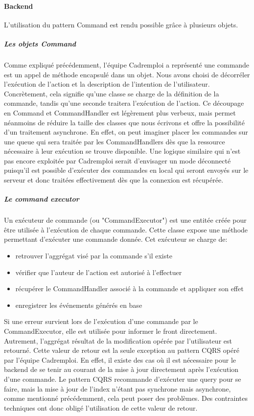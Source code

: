 \paragraph{Backend}
\label{par:Backend}
L'utilisation du pattern Command est rendu possible grâce à plusieurs objets.
\subparagraph{Les objets Command}
\label{subp:Les objets Command}
Comme expliqué précédemment, l'équipe Cadremploi a représenté une commande est un appel de méthode encapsulé dans un objet.
Nous avons choisi de décorréler l'exécution de l'action et la description de l'intention de l'utilisateur.
Concrètement, cela signifie qu'une classe se charge de la définition de la commande, tandis qu'une seconde traitera l'exécution de l'action.
Ce découpage en Command et CommandHandler est légèrement plus verbeux, mais permet néanmoins de réduire la taille des classes que nous écrivons et offre la possibilité d'un traitement asynchrone.
En effet, on peut imaginer placer les commandes sur une queue qui sera traitée par les CommandHandlers dès que la ressource nécessaire à leur exécution se trouve disponible.
Une logique similaire qui n'est pas encore exploitée par Cadremploi serait d'envisager un mode déconnecté puisqu'il est possible d'exécuter des commandes en local qui seront envoyés sur le serveur et donc traitées effectivement dès que la connexion est récupérée.

\subparagraph{Le command executor}
\label{subp:Le command executor}
Un exécuteur de commande (ou "CommandExecutor") est une entitée créée pour être utilisée à l'exécution de chaque commande.
Cette classe expose une méthode permettant d'exécuter une commande donnée.
Cet exécuteur se charge de:
\begin{itemize}
  \item retrouver l'aggrégat visé par la commande s'il existe
  \item vérifier que l'auteur de l'action est autorisé à l'effectuer
  \item récupérer le CommandHandler associé à la commande et appliquer son effet
  \item enregistrer les événements générés en base
\end{itemize}
Si une erreur survient lors de l'exécution d'une commande par le CommandExecutor, elle est utilisée pour informer le front directement.
Autrement, l'aggrégat résultat de la modification opérée par l'utilisateur est retourné.
Cette valeur de retour est la seule exception au pattern CQRS opéré par l'équipe Cadremploi.
En effet, il existe des cas où il est nécessaire pour le backend de se tenir au courant de la mise à jour directement après l'exécution d'une commande.
Le pattern CQRS recommande d'exécuter une query pour se faire, mais la mise à jour de l'index n'étant pas synchrone mais asynchrone, comme mentionné précédemment, cela peut poser des problèmes.
Des contraintes techniques ont donc obligé l'utilisation de cette valeur de retour.


